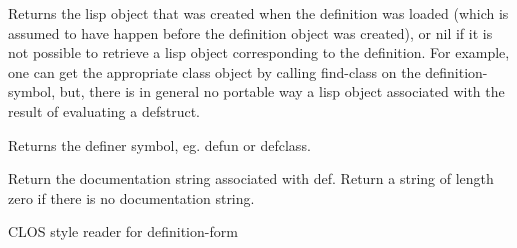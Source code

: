 \endDefinition


\beginDefinition


\beginDocumentation
Returns the lisp object that was created when the
definition was loaded (which is assumed to have happen before the
definition object was created), or nil if it is not possible to
retrieve a lisp object corresponding to the definition. For example,
one can get the appropriate class object by calling find-class on the
\<definition-symbol\>, but, there is in general no portable way a lisp
object associated with the result of evaluating a defstruct.\endDocumentation
{}\endUsage
\beginArguments
{}\endArg
\endArguments
\beginReturn
\singleReturn {}\endtReturn
\endReturn

\endDefinition


\beginDefinition


\beginDocumentation
Returns the definer symbol, eg. \<defun\> or \<defclass\>.\endDocumentation
{}\endUsage
\beginArguments
{}\endArg
\endArguments
\beginReturn
\singleReturn {}\endtReturn
\endReturn

\endDefinition


\beginDefinition


\beginDocumentation
Return the documentation string associated with \<def\>.
Return a string of length zero if there is no documentation string.\endDocumentation
{}\endUsage
\beginArguments
{}\endArg
\endArguments
\beginReturn
\singleReturn {}\endtReturn
\endReturn

\endDefinition


\beginDefinition


\beginDocumentation
CLOS style reader for definition-form\endDocumentation
{}\endUsage
\beginArguments
{}\endArg
\endArguments

